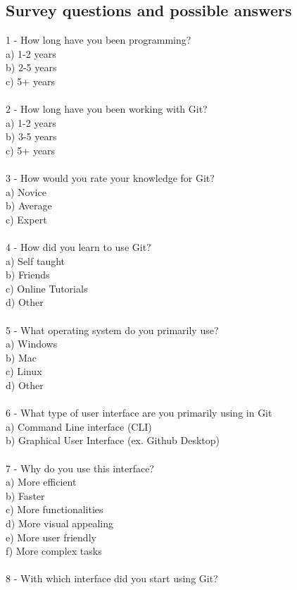 \documentclass[]{report}
\begin{document}
	\subsection{Survey questions and possible answers}
	1 - How long have you been programming?\\
		a) 1-2 years\\
		b) 2-5 years\\
		c) 5+ years\\\\
	2 - How long have you been working with Git?\\
	a) 1-2 years\\
	b) 3-5 years\\
	c) 5+ years\\\\
	3 - How would you rate your knowledge for Git?\\
	a) Novice\\
	b) Average\\
	c) Expert\\\\
	4 - How did you learn to use Git?\\
	a) Self taught\\
	b) Friends\\
	c) Online Tutorials\\
	d) Other\\\\
	5 - What operating system do you primarily use?\\
	a) Windows\\
	b) Mac\\
	c) Linux\\
	d) Other\\\\
	6 - What type of user interface are you primarily using in Git\\
	a) Command Line interface (CLI)\\
	b) Graphical User Interface (ex. Github Desktop)\\\\
	7 - Why do you use this interface?\\
	a) More efficient\\
	b) Faster\\
	c) More functionalities\\
	d) More visual appealing\\
	e) More user friendly\\
	f) More complex tasks\\\\
	8 - With which interface did you start using Git?\\
\end{document}
